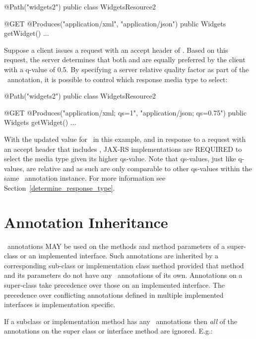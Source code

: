 \begin{listing}{1}
@Path("widgets2")
public class WidgetsResource2 {
  
  @GET
  @Produces("application/xml", "application/json")
  public Widgets getWidget() {...}

}
\end{listing}

Suppose a client issues a  request with an accept header of . Based on this request, the server determines that both  and  are equally preferred by the client with a q-value of 0.5. By specifying a server relative quality factor as part of the \Produces\ annotation, it is possible to control which response media type to select:

\begin{listing}{1}
@Path("widgets2")
public class WidgetsResource2 {
  
  @GET
  @Produces("application/xml; qs=1", "application/json; qs=0.75")
  public Widgets getWidget() {...}

}
\end{listing}

With the updated value for \Produces\ in this example, and in response to a  request with an accept header that includes , JAX-RS implementations are REQUIRED to select the media type  given its higher qs-value. Note that qs-values, just like q-values, are relative and as such are only comparable to other qs-values within the same \Produces\ annotation instance. For more information see Section~\ref{determine_response_type}.

\section{Annotation Inheritance}
\label{annotationinheritance}

\jaxrs\ annotations MAY be used on the methods and method parameters of a super-class or an implemented interface. Such annotations are inherited by a corresponding sub-class or implementation class method provided that method and its parameters do not have any \jaxrs\ annotations of its own. Annotations on a super-class take precedence over those on an implemented interface. The precedence over conflicting annotations defined in multiple implemented interfaces is implementation specific.

If a subclass or implementation method has any \jaxrs\ annotations then {\em all} of the annotations on the super class or interface method are ignored. E.g.:

